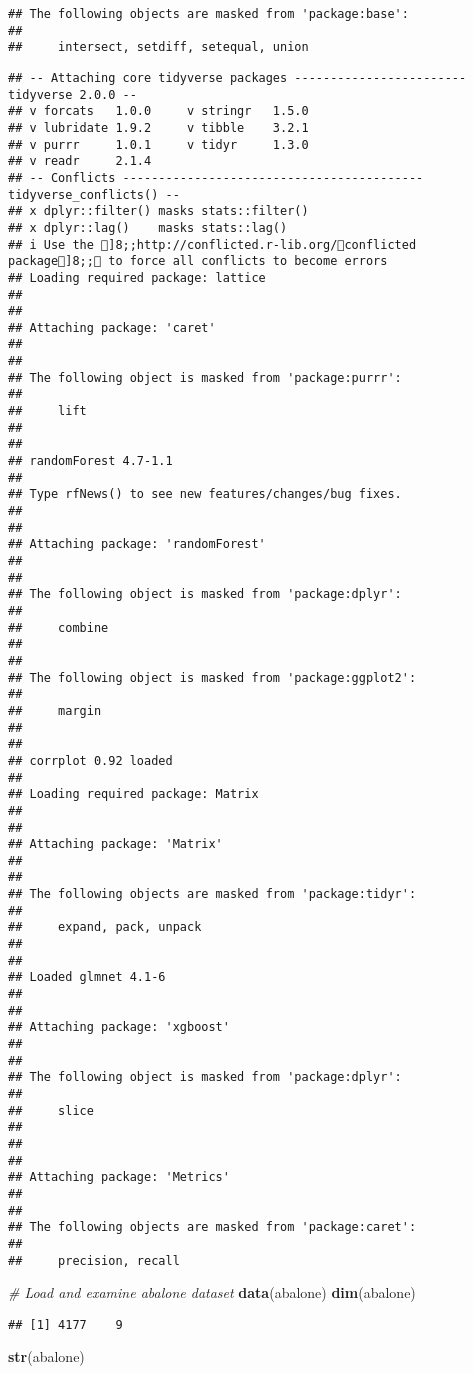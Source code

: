 \documentclass[
]{article}
\newenvironment{Shaded}{\begin{snugshade}}{\end{snugshade}}
\newcommand{\CommentTok}[1]{\textcolor[rgb]{0.56,0.35,0.01}{\textit{#1}}}
\newcommand{\FunctionTok}[1]{\textcolor[rgb]{0.13,0.29,0.53}{\textbf{#1}}}
\newcommand{\NormalTok}[1]{#1}
\begin{document}
\begin{verbatim}
## The following objects are masked from 'package:base':
## 
##     intersect, setdiff, setequal, union
\end{verbatim}

\begin{verbatim}
## -- Attaching core tidyverse packages ------------------------ tidyverse 2.0.0 --
## v forcats   1.0.0     v stringr   1.5.0
## v lubridate 1.9.2     v tibble    3.2.1
## v purrr     1.0.1     v tidyr     1.3.0
## v readr     2.1.4     
## -- Conflicts ------------------------------------------ tidyverse_conflicts() --
## x dplyr::filter() masks stats::filter()
## x dplyr::lag()    masks stats::lag()
## i Use the ]8;;http://conflicted.r-lib.org/conflicted package]8;; to force all conflicts to become errors
## Loading required package: lattice
## 
## 
## Attaching package: 'caret'
## 
## 
## The following object is masked from 'package:purrr':
## 
##     lift
## 
## 
## randomForest 4.7-1.1
## 
## Type rfNews() to see new features/changes/bug fixes.
## 
## 
## Attaching package: 'randomForest'
## 
## 
## The following object is masked from 'package:dplyr':
## 
##     combine
## 
## 
## The following object is masked from 'package:ggplot2':
## 
##     margin
## 
## 
## corrplot 0.92 loaded
## 
## Loading required package: Matrix
## 
## 
## Attaching package: 'Matrix'
## 
## 
## The following objects are masked from 'package:tidyr':
## 
##     expand, pack, unpack
## 
## 
## Loaded glmnet 4.1-6
## 
## 
## Attaching package: 'xgboost'
## 
## 
## The following object is masked from 'package:dplyr':
## 
##     slice
## 
## 
## 
## Attaching package: 'Metrics'
## 
## 
## The following objects are masked from 'package:caret':
## 
##     precision, recall
\end{verbatim}

\begin{Shaded}
\begin{Highlighting}[]
\CommentTok{\# Load and examine abalone dataset}
\FunctionTok{data}\NormalTok{(abalone)}
\FunctionTok{dim}\NormalTok{(abalone)}
\end{Highlighting}
\end{Shaded}

\begin{verbatim}
## [1] 4177    9
\end{verbatim}

\begin{Shaded}
\begin{Highlighting}[]
\FunctionTok{str}\NormalTok{(abalone)}
\end{Highlighting}
\end{Shaded}
\end{document}
